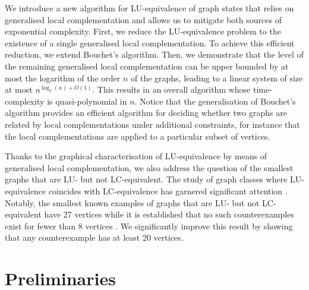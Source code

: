 \documentclass[a4paper,UKenglish,cleveref,autoref,thm-restate]{arxiv}
\begin{document}
We introduce a new algorithm for LU-equivalence of graph states that relies on generalised local complementation and allows us to 
mitigate both sources of exponential complexity. 
First, we reduce the LU-equivalence problem to the existence of a single generalised local complementation. To achieve this efficient reduction, we extend Bouchet's algorithm. Then, we demonstrate that the level of the remaining generalised local complementation can be upper bounded by at most the logarithm of the order $n$ of the graphs, leading to a linear system of size at most $n^{\log_2(n)+O(1)}$. This results in an overall algorithm whose time-complexity is quasi-polynomial in $n$. Notice that the generalisation of Bouchet's algorithm provides an efficient algorithm for deciding whether two graphs are related by local complementations under additional constraints, for instance that the local complementations are applied to a particular subset of vertices.

Thanks to the graphical characterisation of LU-equivalence by means of generalised local complementation, we also address the question of the smallest graphs that are LU- but not LC-equivalent. The study of graph classes where LU-equivalence coincides with LC-equivalence has garnered significant attention  
\cite{Hein04, Hein06, VandenNest05,Zeng07,Ji07,CABELLO20092219,tzitrin2018local,claudet2024local,burchardt2024algorithmverifylocalequivalence}. Notably, the smallest known examples of graphs that are LU- but not LC-equivalent have 27 vertices while it is established that no such counterexamples exist for fewer than 8 vertices \cite{CABELLO20092219}. We significantly  improve this result by showing that any counterexample has at least 20 vertices.  

\section{Preliminaries}
\end{document}

